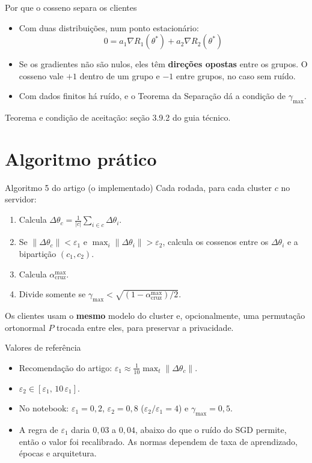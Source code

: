 \documentclass[aspectratio=169]{beamer}
\begin{document}
\begin{frame}{Por que o cosseno separa os clientes}
  \begin{itemize}
    \item Com duas distribuições, num ponto estacionário:
      \[
        0 = a_1 \nabla R_1(\theta^*) + a_2 \nabla R_2(\theta^*)
      \]
    \item Se os gradientes não são nulos, eles têm \textbf{direções opostas} entre os grupos.
      O cosseno vale $+1$ dentro de um grupo e $-1$ entre grupos, no caso sem ruído.
    \item Com dados finitos há ruído, e o Teorema da Separação dá a condição de $\gamma_{\max}$.
  \end{itemize}
  \vspace{0.4em}
  \small Teorema e condição de aceitação: seção 3.9.2 do guia técnico.
\end{frame}

\section{Algoritmo prático}

\begin{frame}{Algoritmo 5 do artigo (o implementado)}
  Cada rodada, para cada cluster $c$ no servidor:
  \begin{enumerate}
    \item Calcula $\Delta\theta_c = \frac{1}{|c|}\sum_{i \in c} \Delta\theta_i$.
    \item Se $\|\Delta\theta_c\| < \varepsilon_1$ e $\max_i \|\Delta\theta_i\| > \varepsilon_2$,
      calcula os cossenos entre os $\Delta\theta_i$ e a bipartição $(c_1, c_2)$.
    \item Calcula $\alpha^{\max}_{\text{cruz}}$.
    \item Divide somente se $\gamma_{\max} < \sqrt{(1 - \alpha^{\max}_{\text{cruz}})/2}$.
  \end{enumerate}
  \vspace{0.4em}
  Os clientes usam o \textbf{mesmo} modelo do cluster e, opcionalmente, uma permutação
  ortonormal $P$ trocada entre eles, para preservar a privacidade.
\end{frame}

\begin{frame}{Valores de referência}
  \begin{itemize}
    \item Recomendação do artigo: $\varepsilon_1 \approx \tfrac{1}{10}\max_t \|\Delta\theta_c\|$.
    \item $\varepsilon_2 \in [\varepsilon_1,\, 10\,\varepsilon_1]$.
    \item No notebook: $\varepsilon_1 = 0{,}2$, $\varepsilon_2 = 0{,}8$ ($\varepsilon_2/\varepsilon_1 = 4$) e
      $\gamma_{\max} = 0{,}5$.
    \item A regra de $\varepsilon_1$ daria $0{,}03$ a $0{,}04$, abaixo do que o ruído do SGD permite,
      então o valor foi recalibrado. As normas dependem de taxa de aprendizado, épocas e arquitetura.
  \end{itemize}
\end{frame}
\end{document}
